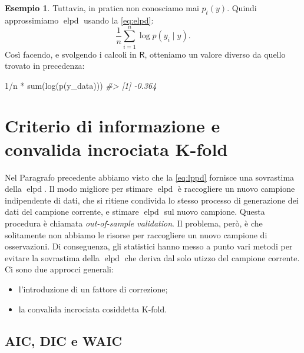 \documentclass[
  10pt,
  italian,
  a4paper,
  extrafontsizes,onecolumn,openright
  ]{memoir}
\newenvironment{Shaded}{\begin{snugshade}}{\end{snugshade}}
\newcommand{\CommentTok}[1]{\textcolor[rgb]{0.56,0.35,0.01}{\textit{#1}}}
\newcommand{\DecValTok}[1]{\textcolor[rgb]{0.00,0.00,0.81}{#1}}
\newcommand{\FunctionTok}[1]{\textcolor[rgb]{0.00,0.00,0.00}{#1}}
\newcommand{\NormalTok}[1]{#1}
\newcommand{\SpecialCharTok}[1]{\textcolor[rgb]{0.00,0.00,0.00}{#1}}
\providecommand{\tightlist}{%
  \setlength{\itemsep}{0pt}\setlength{\parskip}{0pt}}
\DeclareMathOperator{\elpd}{elpd} %
\newcommand{\R}{\textsf{R}} %
\theoremstyle{definition}
\theoremstyle{definition}
\newtheorem{example}{Esempio}[chapter]
\theoremstyle{definition}
\theoremstyle{definition}
\theoremstyle{remark}
\begin{document}
\begin{example}
\noindent
Tuttavia, in pratica non conosciamo mai \(p_t(y)\). Quindi approssimiamo \(\elpd\) usando la \eqref{eq:elpd}:
\[
\frac{1}{n} \sum_{i=1}^n \log p(y_i \mid y).
\]
\noindent
Così facendo, e svolgendo i calcoli in \(\R\), otteniamo un valore diverso da quello trovato in precedenza:

\begin{Shaded}
\begin{Highlighting}[]
\DecValTok{1}\SpecialCharTok{/}\NormalTok{n }\SpecialCharTok{*} \FunctionTok{sum}\NormalTok{(}\FunctionTok{log}\NormalTok{(}\FunctionTok{p}\NormalTok{(y\_data)))}
\CommentTok{\#\textgreater{} [1] {-}0.364}
\end{Highlighting}
\end{Shaded}

\end{example}

\hypertarget{criterio-di-informazione-e-convalida-incrociata-k-fold}{%
\section{Criterio di informazione e convalida incrociata K-fold}\label{criterio-di-informazione-e-convalida-incrociata-k-fold}}

Nel Paragrafo precedente abbiamo visto che la \eqref{eq:lppd} fornisce una sovrastima della \(\elpd\). Il modo migliore per stimare \(\elpd\) è raccogliere un nuovo campione indipendente di dati, che si ritiene condivida lo stesso processo di generazione dei dati del campione corrente, e stimare \(\elpd\) sul nuovo campione. Questa procedura è chiamata \emph{out-of-sample validation}. Il problema, però, è che solitamente non abbiamo le risorse per raccogliere un nuovo campione di osservazioni. Di conseguenza, gli statistici hanno messo a punto vari metodi per evitare la sovrastima della \(\elpd\) che deriva dal solo utizzo del campione corrente. Ci sono due approcci generali:

\begin{itemize}
\tightlist
\item
  l'introduzione di un fattore di correzione;
\item
  la convalida incrociata cosiddetta K-fold.
\end{itemize}

\hypertarget{aic-dic-e-waic}{%
\subsection{AIC, DIC e WAIC}\label{aic-dic-e-waic}}
\end{document}
